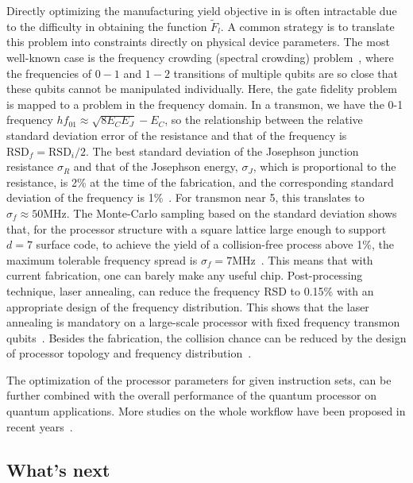 \documentclass[a4paper,onecolumn,11pt,unpublished]{quantumarticle}
\newcommand{\RSD}{\text{RSD}}
\begin{document}
Directly optimizing the manufacturing yield objective in is often intractable due to the difficulty in obtaining the function $\tilde{F}_l$. A common strategy is to translate this problem into constraints directly on physical device parameters. The most well-known case is the frequency crowding (spectral crowding) problem~\cite{Schutjens2013Singlequbit,Egger2014Optimal,Theis2016Simultaneous}, where the frequencies of $0-1$ and $1-2$ transitions of multiple qubits are so close that these qubits cannot be manipulated individually. Here, the gate fidelity problem is mapped to a problem in the frequency domain. In a transmon, we have the 0-1 frequency $hf_{01}\approx \sqrt{8E_CE_J}-E_C$, so the relationship between the relative standard deviation error of the resistance and that of the frequency is $\RSD_f=\RSD_i/2$. The best standard deviation of the Josephson junction resistance $\sigma_R$ and that of the Josephson energy, $\sigma_{J}$, which is proportional to the resistance, is 2\% at the time of the fabrication, and the corresponding standard deviation of the frequency is 1\%~\cite{Kreikebaum2020Improving}. For transmon near 5, this translates to $\sigma_f\approx50\text{MHz}$. The Monte-Carlo sampling based on the standard deviation shows that, for the processor structure with a square lattice large enough to support $d=7$ surface code, to achieve the yield of a collision-free process above 1\%, the maximum tolerable frequency spread is $\sigma_f=7\text{MHz}$~\cite{Hertzberg2021Laserannealing}. This means that with current fabrication, one can barely make any useful chip. Post-processing technique, laser annealing, can reduce the frequency RSD to 0.15\% with an appropriate design of the frequency distribution. This shows that the laser annealing is mandatory on a large-scale processor with fixed frequency transmon qubits~\cite{Hertzberg2021Laserannealing,Kim2022Effects,Kreikebaum2020Improving,Zhang2022Highperformance}. Besides the fabrication, the collision chance can be reduced by the design of processor topology and frequency distribution~\cite{Yang2023A}.

The optimization of the processor parameters for given instruction sets, can be further combined with the overall performance of the quantum processor on quantum applications. More studies on the whole workflow have been proposed in recent years~\cite{Zhao2025EDAQ,LevensonFalk2025A,Li2023Quantum,Li2023Towards,Yang2024A}.

\subsection{What's next}
\end{document}
